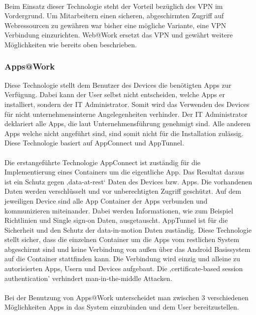 \paragraph*{}
Beim Einsatz dieser Technologie steht der Vorteil bezüglich des VPN im Vordergrund. Um Mitarbeitern einen sicheren, abgeschirmten Zugriff auf Webressourcen zu gewähren war bisher eine mögliche Variante, eine VPN Verbindung einzurichten. Web@Work ersetzt das VPN und gewährt weitere Möglichkeiten wie bereits oben beschrieben.

\subsubsection{Apps@Work}
Diese Technologie stellt dem Benutzer des Devices die benötigten Apps zur Verfügung. Dabei kann der User selbst nicht entscheiden, welche Apps er installiert, sondern der IT Administrator. Somit wird das Verwenden des Devices für nicht unternehmensinterne Angelegenheiten verhinder. Der IT Administrator deklariert alle Apps, die laut Unternehmensführung genehmigt sind. Alle anderen Apps welche nicht angeführt sind, sind somit nicht für die Installation zulässig. Diese Technologie basiert auf AppConnect und AppTunnel.
\paragraph*{}
Die erstangeführte Technologie AppConnect ist zuständig für die Implementierung eines Containers um die eigentliche App. Das Resultat daraus ist ein Schutz gegen ‚data-at-rest‘ Daten des Devices bzw. Apps. Die vorhandenen Daten werden verschlüsselt und vor unberechtigten Zugriff geschützt. Auf dem jeweiligen Device sind alle App Container der Apps verbunden und kommunizieren miteinander. Dabei werden Informationen, wie zum Beispiel Richtlinien und Single sign-on Daten, ausgetauscht. \newline
AppTunnel ist für die Sicherheit und den Schutz der data-in-motion Daten zuständig. Diese Technologie stellt sicher, dass die einzelnen Container um die Apps vom restlichen System abgeschirmt sind und keine Verbindung von außen über das Android Basissystem auf die Container stattfinden kann. Die Verbindung wird einzig und alleine zu autorisierten Apps, Usern und Devices aufgebaut. Die ‚certificate-based session authentication’ verhindert man-in-the-middle Attacken.
\paragraph*{}
Bei der Benutzung von Apps@Work unterscheidet man zwischen 3 verschiedenen Möglichkeiten Apps in das System einzubinden und dem User bereitzustellen.

